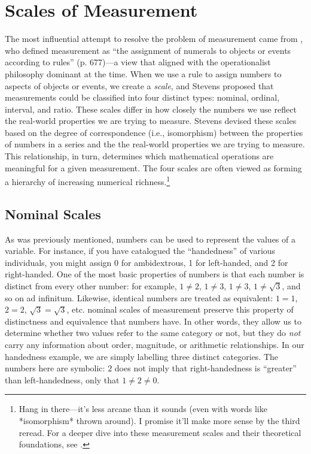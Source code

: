 \section{Scales of Measurement}

The most influential attempt to resolve the problem of measurement came from \textcite{Stevens1946}, who defined measurement as ``the assignment of numerals to objects or events according to rules'' (p. 677)—a view that aligned with the operationalist philosophy dominant at the time. When we use a rule to assign numbers to aspects of objects or events, we create a \textit{scale}, and Stevens proposed that measurements could be classified into four distinct types: nominal, ordinal, interval, and ratio. These scales differ in how closely the numbers we use reflect the real-world properties we are trying to measure. Stevens devised these scales based on the degree of correspondence (i.e., isomorphism) between the properties of numbers in a series and the the real-world properties we are trying to measure. This relationship, in turn, determines which mathematical operations are meaningful for a given measurement. The four scales are often viewed as forming a hierarchy of increasing numerical richness.\footnote{Hang in there—it’s less arcane than it sounds (even with words like *isomorphism* thrown around). I promise it’ll make more sense by the third reread. For a deeper dive into these measurement scales and their theoretical foundations, see \citeauthor{Stevens1951} \citeyear{Stevens1951}.}

\subsection{Nominal Scales}
\label{sec:nominal}

As was previously mentioned, numbers can be used to represent the values of a variable. For instance, if you have catalogued the ``handedness'' of various individuals, you might assign 0 for ambidextrous, 1 for left-handed, and 2 for right-handed. One of the most basic properties of numbers is that each number is distinct from every other number: for example, $1 \neq 2$, $1 \neq 3$, $1 \neq 3$, $1 \neq \sqrt{3}$, and so on ad infinitum. Likewise, identical numbers are treated as equivalent: $1 = 1$, $2 = 2$, $\sqrt{3} = \sqrt{3}$, etc. \Glspl{nominal scale} of measurement preserve this property of distinctness and equivalence that numbers have. In other words, they allow us to determine whether two values refer to the same category or not, but they do \textit{not} carry any information about order, magnitude, or arithmetic relationships. In our handedness example, we are simply labelling three distinct categories. The numbers here are symbolic: $2$ does not imply that right-handedness is ``greater'' than left-handedness, only that $1 \neq 2 \neq 0$.

